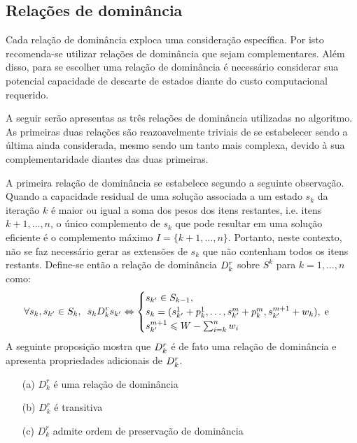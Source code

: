 
\subsection{Relações de dominância}
\label{sec:reldom}

Cada relação de dominância exploca uma consideração específica.
Por isto recomenda-se utilizar relações de dominância que sejam complementares.
Além disso, para se escolher uma relação de dominância é necessário considerar
sua potencial capacidade de descarte de estados diante do
custo computacional requerido.

A seguir serão apresentas as três relações de dominância utilizadas no algoritmo.
As primeiras duas relações são reazoavelmente triviais de se estabelecer sendo
a última ainda considerada, mesmo sendo um tanto mais complexa, devido à sua
complementaridade diantes das duas primeiras.

A primeira relação de dominância se estabelece segundo a seguinte observação.
Quando a capacidade residual de uma solução associada a um estado $s_k$
da iteração $k$ é maior ou igual a soma dos pesos dos itens restantes,
i.e. itens $k+1, \ldots, n$, o único complemento de $s_k$ que pode resultar
em uma solução eficiente é o complemento máximo $I = \{k+1, \ldots, n\}$.
Portanto, neste contexto, não se faz necessário gerar as extensões de $s_k$
que não contenham todos os itens restants.
Define-se então a relação de dominância $D_k^r$ sobre $S^k$ para
$k = 1, \ldots, n$ como:
\begin{displaymath}
  \forall s_k, s_{{k'}} \in S_k, \enskip
  s_k D_k^r s_{{k'}}
    \Leftrightarrow
    \begin{cases}
      s_{{k'}} \in S_{k-1}, \\
      s_k = (s_{{k'}}^1 + p_k^1, \ldots, s_{{k'}}^m + p_k^m, s_{{k'}}^{m+1} + w_k), \; \text{e} \\
      s_{{k'}}^{m+1} \leqslant W - \sum_{i=k}^n w_i
    \end{cases}
\end{displaymath}
A seguinte proposição mostra que $D_k^r$ é de fato uma relação de dominância
e apresenta propriedades adicionais de $D_k^r$.

\begin{myprop}[Relação $D_k^r$]
  \noindent
  \begin{enumerate}
    \item[(a)] $D_k^r$ é uma relação de dominância
    \item[(b)] $D_k^r$ é transitiva
    \item[(c)] $D_k^r$ admite ordem de preservação de dominância
\end{enumerate}
\end{myprop}

